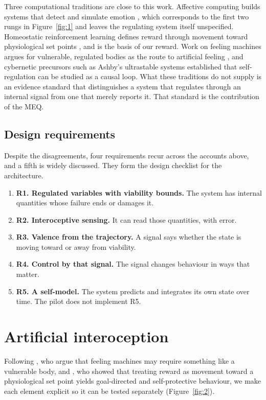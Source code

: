 \documentclass[twoside,11pt]{article}
\begin{document}
Three computational traditions are close to this work. Affective computing builds systems that detect and simulate emotion \citep{picard1997}, which corresponds to the first two rungs in Figure~\ref{fig:1} and leaves the regulating system itself unspecified. Homeostatic reinforcement learning defines reward through movement toward physiological set points \citep{keramati2014}, and is the basis of our reward. Work on feeling machines argues for vulnerable, regulated bodies as the route to artificial feeling \citep{man2019}, and cybernetic precursors such as Ashby's \citeyearpar{ashby1952} ultrastable systems established that self-regulation can be studied as a causal loop. What these traditions do not supply is an evidence standard that distinguishes a system that regulates through an internal signal from one that merely reports it. That standard is the contribution of the MEQ.

\subsection{Design requirements}\label{sec:2.4}

Despite the disagreements, four requirements recur across the accounts above, and a fifth is widely discussed. They form the design checklist for the architecture.

\begin{enumerate}
\def\labelenumi{}
\item
  \textbf{R1. Regulated variables with viability bounds.} The system has internal quantities whose failure ends or damages it.
\item
  \textbf{R2. Interoceptive sensing.} It can read those quantities, with error.
\item
  \textbf{R3. Valence from the trajectory.} A signal says whether the state is moving toward or away from viability.
\item
  \textbf{R4. Control by that signal.} The signal changes behaviour in ways that matter.
\item
  \textbf{R5. A self-model.} The system predicts and integrates its own state over time. The pilot does not implement R5.
\end{enumerate}

\section{Artificial interoception}\label{sec:3}

Following \citet{man2019}, who argue that feeling machines may require something like a vulnerable body, and \citet{keramati2014}, who showed that treating reward as movement toward a physiological set point yields goal-directed and self-protective behaviour, we make each element explicit so it can be tested separately (Figure~\ref{fig:2}).
\end{document}
